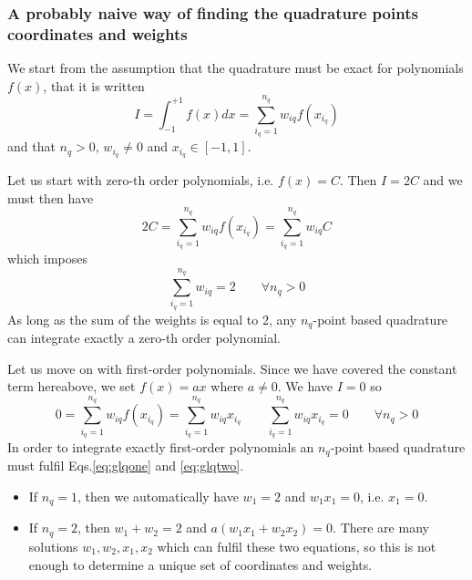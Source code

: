 \subsubsection{A probably naive way of finding the quadrature points coordinates and weights}


We start from the assumption that the quadrature must be exact for polynomials $f(x)$, that it is 
written
\[
I= \int_{-1}^{+1} f(x) dx = \sum_{i_q=1}^{n_q} w_{iq} f(x_{i_q}) 
\]
and that $n_q>0$, $w_{i_q}\neq 0$ and $x_{i_q}\in [-1,1]$.

Let us start with zero-th order polynomials, i.e. $f(x)=C$. Then $I=2C$ and we must then 
have 
\[
2C = \sum_{i_q=1}^{n_q} w_{iq} f(x_{i_q})  =  \sum_{i_q=1}^{n_q} w_{iq} C   
\]
which imposes 
\begin{equation}
\boxed{
\sum_{i_q=1}^{n_q} w_{iq} = 2 \qquad \forall n_q>0
}
\label{eq:glqone}
\end{equation}
As long as the sum of the weights is equal to 2, any $n_q$-point based quadrature can 
integrate exactly a zero-th order polynomial. 

Let us move on with first-order polynomials. Since we have covered the constant term hereabove, we
set $f(x)=ax$ where $a\neq 0$. We have $I=0$ so
\begin{equation}
0 = \sum_{i_q=1}^{n_q} w_{iq} f(x_{i_q})  = \sum_{i_q=1}^{n_q} w_{iq} x_{i_q}
\qquad
\boxed{
\sum_{i_q=1}^{n_q} w_{iq} x_{i_q} = 0\qquad \forall n_q>0
}
 \label{eq:glqtwo}
\end{equation}
In order to integrate exactly first-order polynomials an $n_q$-point based quadrature must 
fulfil Eqs.\eqref{eq:glqone} and \eqref{eq:glqtwo}.
\begin{itemize}
\item
If $n_q=1$, then we automatically have $w_1=2$ and $w_1 x_1 =0 $, i.e. $x_1=0$.
\item
If $n_q=2$, then $w_1+w_2=2$ and $a(w_1x_1+w_2x_2) = 0$. There are many solutions $w_1,w_2,x_1,x_2$ which 
can fulfil these two equations, so this is not enough to determine a unique set of coordinates and weights.
\end{itemize}

